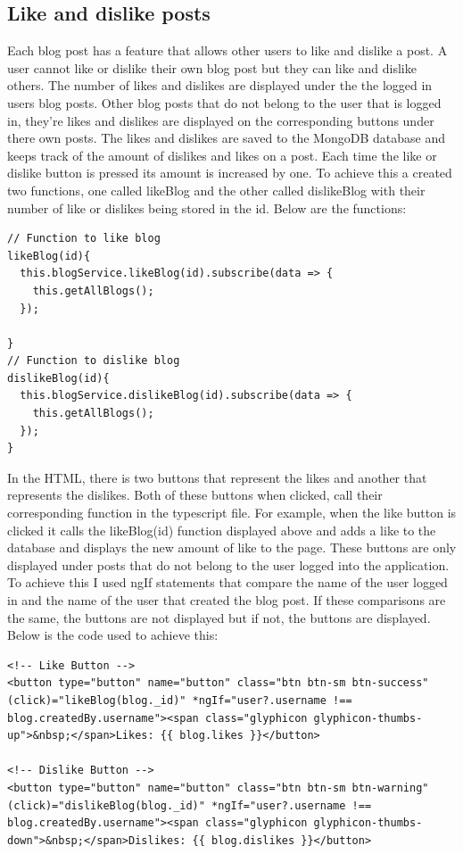\subsection{Like and dislike posts}
Each blog post has a feature that allows other users to like and dislike a post. A user cannot like or dislike their own blog post but they can like and dislike others. The number of likes and dislikes are displayed under the the logged in users blog posts. Other blog posts that do not belong to the user that is logged in, they're likes and dislikes are displayed on the corresponding buttons under there own posts. The likes and dislikes are saved to the MongoDB database and keeps track of the amount of dislikes and likes on a post. Each time the like or dislike button is pressed its amount is increased by one. To achieve this a created two functions, one called likeBlog and the other called dislikeBlog with their number of like or dislikes being stored in the id. Below are the functions:

\begin{lstlisting}
// Function to like blog
likeBlog(id){
  this.blogService.likeBlog(id).subscribe(data => {
    this.getAllBlogs();
  });
  
}
// Function to dislike blog
dislikeBlog(id){
  this.blogService.dislikeBlog(id).subscribe(data => {
    this.getAllBlogs();
  });
}
\end{lstlisting}

In the HTML, there is two buttons that represent the likes and another that represents the dislikes. Both of these buttons when clicked, call their corresponding function in the typescript file. For example, when the like button is clicked it calls the likeBlog(id) function displayed above and adds a like to the database and displays the new amount of like to the page. These buttons are only displayed under posts that do not belong to the user logged into the application. To achieve this I used ngIf statements that compare the name of the user logged in and the name of the user that created the blog post. If these comparisons are the same, the buttons are not displayed but if not, the buttons are displayed. Below is the code used to achieve this:

\begin{lstlisting}
<!-- Like Button -->
<button type="button" name="button" class="btn btn-sm btn-success" (click)="likeBlog(blog._id)" *ngIf="user?.username !== blog.createdBy.username"><span class="glyphicon glyphicon-thumbs-up">&nbsp;</span>Likes: {{ blog.likes }}</button>

<!-- Dislike Button -->
<button type="button" name="button" class="btn btn-sm btn-warning" (click)="dislikeBlog(blog._id)" *ngIf="user?.username !== blog.createdBy.username"><span class="glyphicon glyphicon-thumbs-down">&nbsp;</span>Dislikes: {{ blog.dislikes }}</button>
\end{lstlisting}

